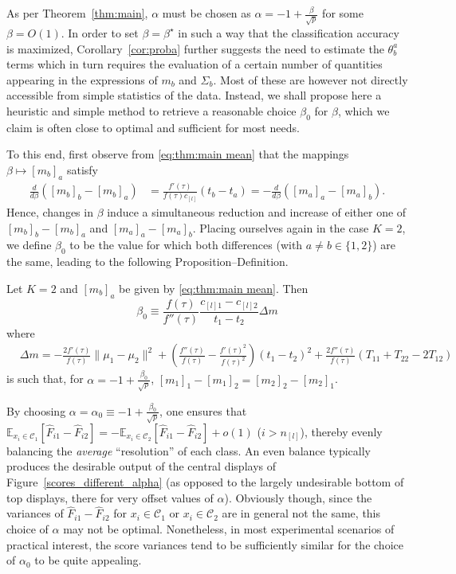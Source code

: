 \documentclass[twoside,11pt]{article}
\def\ftau{f(\tau)}
\def\ffftau{f''(\tau)}
\begin{document}
\medskip

As per Theorem~\ref{thm:main}, $\alpha$ must be chosen as $\alpha=-1+\frac{\beta}{\sqrt{p}}$ for some $\beta=O(1)$. In order to set $\beta=\beta^\star$ in such a way that the classification accuracy is maximized, Corollary~\ref{cor:proba} further suggests the need to estimate the $\theta_b^a$ terms which in turn requires the evaluation of a certain number of quantities appearing in the expressions of $m_b$ and $\Sigma_b$. Most of these are however not directly accessible from simple statistics of the data. Instead, we shall propose here a heuristic and simple method to retrieve a reasonable choice $\beta_0$ for $\beta$, which we claim is often close to optimal and sufficient for most needs.

To this end, first observe from \eqref{eq:thm:main mean} that the mappings $\beta\mapsto [m_b]_a$ satisfy
\begin{align*}
	\frac{d}{d\beta}([m_b]_b-[m_b]_a) &= \frac{f'(\tau)}{f(\tau)c_{[l]}}(t_b-t_a) = -\frac{d}{d\beta}([m_a]_a-[m_a]_b).
\end{align*}
Hence, changes in $\beta$ induce a simultaneous reduction and increase of either one of $[m_b]_b-[m_b]_a$ and $[m_a]_a-[m_a]_b$. Placing ourselves again in the case $K=2$, we define $\beta_0$ to be the value for which both differences (with $a\neq b\in\{1,2\}$) are the same, leading to the following Proposition--Definition.

\begin{proposition}
	\label{prop:beta0}
	Let $K=2$ and $[m_b]_a$ be given by \eqref{eq:thm:main mean}. Then
	\begin{equation}
		\label{eq:beta opt}
		\beta_0 \equiv \frac{\ftau}{\ffftau} \frac{c_{[l]1}-c_{[l]2}}{t_1-t_2}\Delta m
	\end{equation}	
	where \begin{align*}
		&\Delta m=-\frac{2f'(\tau)}{f(\tau)} \|\mu_1-\mu_2\|^2+\left( \frac{f''(\tau)}{f(\tau)} - \frac{f'(\tau)^2}{f(\tau)^2} \right)(t_1-t_2)^2 + \frac{2f''(\tau)}{f(\tau)}(T_{11}+T_{22}-2T_{12})
	\end{align*}
	is such that, for $\alpha=-1+\frac{\beta_0}{\sqrt{p}}$, $[m_1]_1-[m_1]_2=[m_2]_2-[m_2]_1$.
\end{proposition}

By choosing $\alpha=\alpha_0\equiv -1+\frac{\beta_0}{\sqrt{p}}$, one ensures that $\mathbb{E}_{x_i\in\mathcal C_1}[\hat F_{i1}-\hat F_{i2}]=-\mathbb{E}_{x_i\in\mathcal C_2}[\hat F_{i1}-\hat F_{i2}]+o(1)$ ($i>n_{[l]}$), thereby evenly balancing the {\it average} ``resolution'' of each class. An even balance typically produces the desirable output of the central displays of Figure~\ref{scores_different_alpha} (as opposed to the largely undesirable bottom of top displays, there for very offset values of $\alpha$). Obviously though, since the variances of $\hat F_{i1}-\hat F_{i2}$ for $x_i\in\mathcal C_1$ or $x_i\in\mathcal C_2$ are in general not the same, this choice of $\alpha$ may not be optimal. Nonetheless, in most experimental scenarios of practical interest, the score variances tend to be sufficiently similar for the choice of $\alpha_0$ to be quite appealing.
\end{document}
